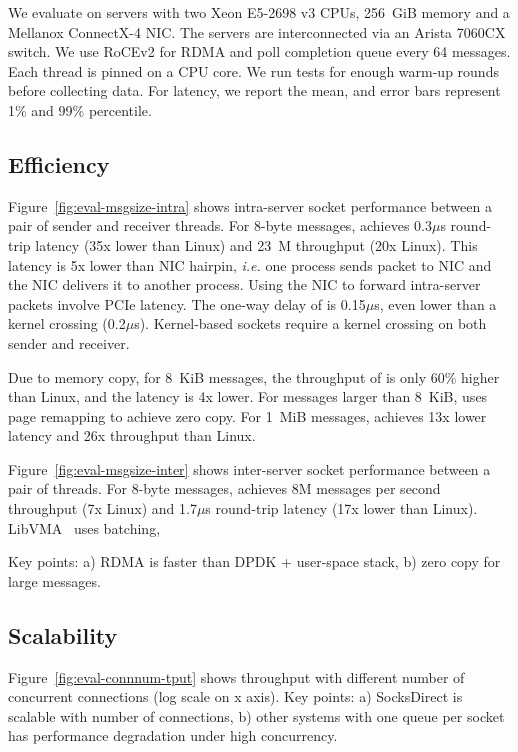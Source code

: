 We evaluate \sys on servers with two Xeon E5-2698 v3 CPUs, 256~GiB memory and a Mellanox ConnectX-4 NIC. The servers are interconnected via an Arista 7060CX switch. We use RoCEv2 for RDMA and poll completion queue every 64 messages.
Each thread is pinned on a CPU core. We run tests for enough warm-up rounds before collecting data. For latency, we report the mean, and error bars represent 1\% and 99\% percentile.

\subsection{Efficiency}



Figure~\ref{fig:eval-msgsize-intra} shows intra-server socket performance between a pair of sender and receiver threads.
For 8-byte messages, \sys achieves 0.3$\mu$s round-trip latency (35x lower than Linux) and 23~M throughput (20x Linux).
This latency is 5x lower than NIC hairpin, \textit{i.e.} one process sends packet to NIC and the NIC delivers it to another process. Using the NIC to forward intra-server packets involve PCIe latency.
The one-way delay of \sys is 0.15$\mu$s, even lower than a kernel crossing (0.2$\mu$s). Kernel-based sockets require a kernel crossing on both sender and receiver.

Due to memory copy, for 8~KiB messages, the throughput of \sys is only 60\% higher than Linux, and the latency is 4x lower. For messages larger than 8~KiB, \sys uses page remapping to achieve zero copy. For 1~MiB messages, \sys achieves 13x lower latency and 26x throughput than Linux.


Figure~\ref{fig:eval-msgsize-inter} shows inter-server socket performance between a pair of threads.
For 8-byte messages, \sys achieves 8M messages per second throughput (7x Linux) and 1.7$\mu$s round-trip latency (17x lower than Linux).
LibVMA~\cite{libvma} uses batching, 

Key points: a) RDMA is faster than DPDK + user-space stack, b) zero copy for large messages.






\subsection{Scalability}


Figure~\ref{fig:eval-connnum-tput} shows throughput with different number of concurrent connections (log scale on x axis). Key points: a) SocksDirect is scalable with number of connections, b) other systems with one queue per socket has performance degradation under high concurrency.

